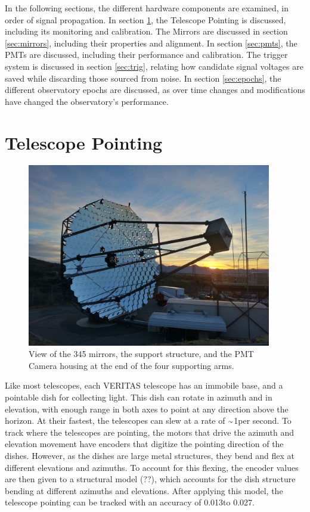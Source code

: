 In the following sections, the different hardware components are examined, in order of signal propagation.
In section \ref{sec:telpoint}, the Telescope Pointing is discussed, including its monitoring and calibration.
The Mirrors are discussed in section \ref{sec:mirrors}, including their properties and alignment.
In section \ref{sec:pmts}, the PMTs are discussed, including their performance and calibration.
The trigger system is discussed in section \ref{sec:trig}, relating how candidate signal voltages are saved while discarding those sourced from noise.
In section \ref{sec:epochs}, the different observatory epochs are discussed, as over time changes and modifications have changed the observatory's performance.


\section{Telescope Pointing}\label{sec:telpoint}

\begin{figure}[ht]
  \begin{center}
    \includegraphics[width=0.95\textwidth]{images/single_telescope}
    \caption[Single Veritas Telescope]{View of the 345 mirrors, the support structure, and the PMT Camera housing at the end of the four supporting arms.}\label{fig:davcottel}
  \end{center}
\end{figure}

Like most telescopes, each VERITAS telescope has an immobile base, and a pointable dish for collecting light.
This dish can rotate in azimuth and in elevation, with enough range in both axes to point at any direction above the horizon.
At their fastest, the telescopes can slew at a rate of $\nicetilde$1\degree per second.
To track where the telescopes are pointing, the motors that drive the azimuth and elevation movement have encoders that digitize the pointing direction of the dishes.
However, as the dishes are large metal structures, they bend and flex at different elevations and azimuths.
To account for this flexing, the encoder values are then given to a structural model (??), which accounts for the dish structure bending at different azimuths and elevations.
After applying this model, the telescope pointing can be tracked with an accuracy of 0.013\degree to 0.027\degree \cite{Veritas_Detector}.

